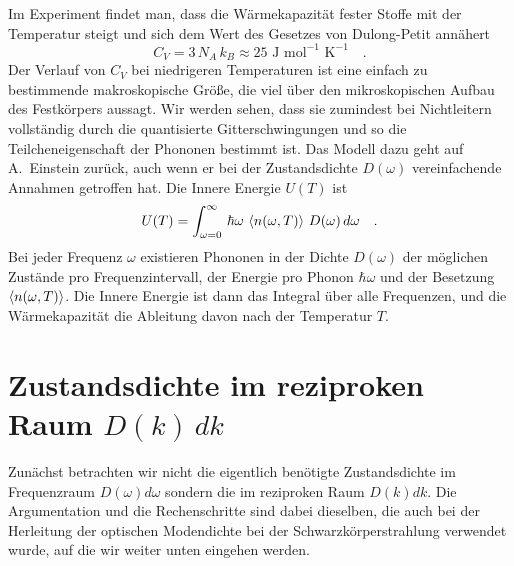Im Experiment findet man, dass die Wärmekapazität fester Stoffe mit der Temperatur steigt und sich dem Wert des Gesetzes von Dulong-Petit annähert
\begin{equation}
 C_V = 3 \, N_A \, k_B \approx 25 \text{~J} \text{~mol}^{-1} \text{~K}^{-1} \quad .
\end{equation}
Der Verlauf von $ C_V$ bei niedrigeren Temperaturen ist eine einfach zu bestimmende makroskopische Größe, die viel über den mikroskopischen Aufbau des Festkörpers aussagt. Wir werden sehen, dass sie zumindest bei Nichtleitern vollständig durch die quantisierte  Gitterschwingungen und so die Teilcheneigenschaft der Phononen bestimmt ist. Das Modell dazu geht auf A.~Einstein zurück, auch wenn er bei der Zustandsdichte $D(\omega)$ vereinfachende Annahmen getroffen hat. Die Innere Energie $U(T)$ ist
\begin{equation}
U(T) = \int_{\omega=0}^{\infty} \, \hbar \omega \, \braket{ n (\omega, T) } \, D(\omega) \, d\omega \label{eq:wk_u_allg} \quad .
\end{equation}
Bei jeder Frequenz $\omega$ existieren Phononen in der Dichte $D(\omega)$ der möglichen Zustände pro Frequenzintervall, der Energie pro Phonon $\hbar \omega$ und der Besetzung $\braket{ n (\omega, T) } $. Die Innere Energie ist dann das Integral über alle Frequenzen, und die Wärmekapazität die Ableitung davon nach der Temperatur $T$.


\section{Zustandsdichte im reziproken Raum $D(k) \, dk$ }

Zunächst betrachten wir nicht die eigentlich benötigte Zustandsdichte im Frequenzraum $D(\omega) d\omega$ sondern die im reziproken Raum $D(k) dk$. Die Argumentation und die Rechenschritte sind dabei dieselben, die auch bei der Herleitung der optischen Modendichte bei der Schwarzkörperstrahlung verwendet wurde, auf die wir weiter unten eingehen werden.

